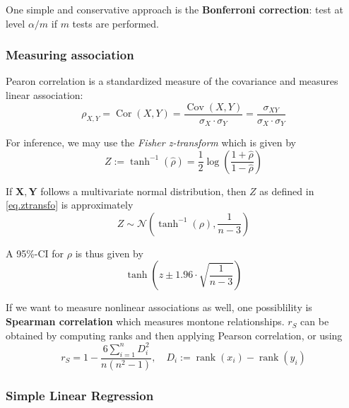 \documentclass[11pt, %
	oneside, %
	english, %
	onehalfspacing, %
	]{article} %
\numberwithin{equation}{section}
\begin{document}
One simple and conservative approach is the \textbf{Bonferroni correction}: test at level $\alpha / m$ if $m$ tests are performed.


\subsubsection{Measuring association}

Pearon correlation is a standardized measure of the covariance and measures linear association:
\begin{equation*}
    \rho_{X, Y}=\operatorname{Cor}(X, Y)=\frac{\operatorname{Cov}(X, Y)}{\sigma_X \cdot \sigma_Y}=\frac{\sigma_{X Y}}{\sigma_X \cdot \sigma_Y}
\end{equation*}

For inference, we may use the \emph{Fisher z-transform} which is given by
\begin{equation}\label{eq.ztransfo}
    Z:=\tanh ^{-1}(\widehat{\rho})=\frac{1}{2} \log \left(\frac{1+\widehat{\rho}}{1-\widehat{\rho}}\right)
\end{equation}

\begin{proposition}{}{}
    If $\mathbf{X}, \mathbf{Y}$ follows a multivariate normal distribution, then $Z$ as defined in \eqref{eq.ztransfo} is approximately
    \begin{equation*}
        Z \sim \mathcal{N}\left(\tanh ^{-1}(\rho), \frac{1}{n-3}\right)
    \end{equation*}
\end{proposition}

A 95\%-CI for $\rho$ is thus given by
\begin{equation*}
    \tanh \left(z \pm 1.96 \cdot \sqrt{\frac{1}{n-3}}\right)
\end{equation*}

If we want to measure nonlinear associations as well, one possiblility is \textbf{Spearman correlation} which measures montone relationships. $r_S$ can be obtained by computing ranks and then applying Pearson correlation, or using
\begin{equation*}
    r_S=1-\frac{6 \sum_{i=1}^n D_i^2}{n\left(n^2-1\right)}, \quad D_i:=\operatorname{rank}\left(x_i\right)-\operatorname{rank}\left(y_i\right)
\end{equation*}


\subsubsection*{Simple Linear Regression}
\end{document}

